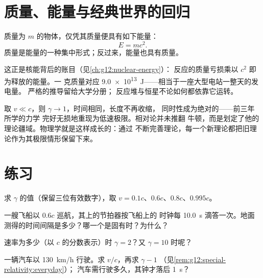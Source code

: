 \section{质量、能量与经典世界的回归}

\begin{theorem}[质量–能量等价]\label{thm:g12:special-relativity:emc2}
质量为 $m$ 的物体，仅凭其质量便具有如下能量：
\[ E = m c^2 . \]
质量是能量的一种集中形式；反过来，能量也具有质量。
\end{theorem}
\admitted

\begin{remark}[你在哪里见过它]\label{rem:g12:special-relativity:emc2seen}
这正是核能背后的账目（见\cref{ch:g12:nuclear-energy}）：
反应的质量亏损乘以 $c^2$ 即为释放的能量。一
克质量对应 \qty{9.0e13}{J}——相当于一座大型电站一整天的发电量。
严格的推导留给大学分册；
反应堆与恒星不论如何都依靠它运转。
\end{remark}

\begin{remark}[牛顿并没有错]\label{rem:g12:special-relativity:newton}
取 $v \ll c$，则 $\gamma \to 1$，时间相同，长度不再收缩，
同时性成为绝对的——前三年所学的力学
完好无损地重现为低速极限。相对论并未推翻
牛顿，而是划定了他的理论疆域。物理学就是这样成长的：通过
不断完善理论，每一个新理论都把旧理论作为其极限情形保留下来。
\end{remark}

\section{练习}

\begin{exercise}[$\star$]\label{exo:g12:special-relativity:1}
求 $\gamma$ 的值（保留三位有效数字），取 $v = 0.1c$、$0.6c$、$0.8c$、$0.995c$。
\end{exercise}

\begin{exercise}[$\star$]\label{exo:g12:special-relativity:2}
一艘飞船以 $0.6c$ 巡航，其上的节拍器按飞船上的
时钟每 \qty{10.0}{s} 滴答一次。地面测得的时间间隔是多少？哪一个是固有时？为什么？
\end{exercise}

\begin{exercise}[$\star$]\label{exo:g12:special-relativity:3}
速率为多少（以 $c$ 的分数表示）时 $\gamma = 2$？又 $\gamma = 10$ 时呢？
\end{exercise}

\begin{exercise}[$\star$]\label{exo:g12:special-relativity:4}
一辆汽车以 \qty{130}{km/h} 行驶。求 $v/c$，再求 $\gamma - 1$
（见\cref{rem:g12:special-relativity:everyday}）；
汽车需行驶多久，其钟才落后 \qty{1}{s}？
\end{exercise}


